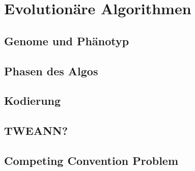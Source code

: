 \section{Evolutionäre Algorithmen}
\subsection{Genome und Phänotyp}
\subsection{Phasen des Algos}
\subsection{Kodierung}
\subsection{TWEANN?}
\label{subsec:tweann}
\subsection{Competing Convention Problem}
\label{subsec:competing_convention_problem}